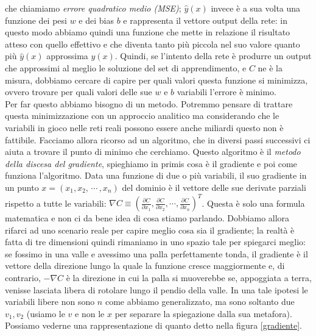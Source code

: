 che chiamiamo \textit{errore quadratico medio (MSE)}; $\hat{y}(x)$ invece è a sua volta una funzione dei pesi $w$ e dei bias $b$ e rappresenta il vettore output della rete: in questo modo abbiamo quindi una funzione che mette in relazione il risultato atteso con quello effettivo e che diventa tanto più piccola nel suo valore quanto più $\hat{y}(x)$ approssima $y(x)$. Quindi, se l'intento della rete è produrre un output che approssimi al meglio le soluzione del set di apprendimento, e $C$ ne è la misura, dobbiamo cercare di capire per quali valori questa funzione si minimizza, ovvero trovare per quali valori delle sue $w$ e $b$ variabili l'errore è minimo. 
\\
Per far questo abbiamo bisogno di un metodo. Potremmo pensare di trattare questa minimizzazione con un approccio analitico ma considerando che le variabili in gioco nelle reti reali possono essere anche miliardi questo non è fattibile. 
Facciamo allora ricorso ad un algoritmo, che in diversi passi successivi ci aiuta a trovare il punto di minimo che cerchiamo. Questo algoritmo è il \textit{metodo della discesa del gradiente}, spieghiamo in primis cosa è il gradiente e poi come funziona l'algoritmo.
Data una funzione di due o più variabili, il suo gradiente in un punto $x=(x_{1}, x_{2},\, \cdots \, , x_{n})$ del dominio è il vettore delle sue derivate parziali rispetto a tutte le variabili: $\nabla C \equiv (\frac{\partial C}{\partial x_{1}}, \frac{\partial C}{\partial x_{2}}, \cdots, \frac{\partial C}{\partial x_{n}})^{T}$. Questa è solo una formula matematica e non ci da bene idea di cosa stiamo parlando. Dobbiamo allora rifarci ad uno scenario reale per capire meglio cosa sia il gradiente; la realtà è fatta di tre dimensioni quindi rimaniamo in uno spazio tale per spiegarci meglio: se fossimo in una valle e avessimo una palla perfettamente tonda, il gradiente è il vettore della direzione lungo la quale la funzione cresce maggiormente e, di contrario, $-\nabla C$ è la direzione in cui la palla si muoverebbe se, appoggiata a terra, venisse lasciata libera di rotolare lungo il pendio della valle. In una tale ipotesi le variabili libere non sono $n$ come abbiamo generalizzato, ma sono soltanto due $v_{1}, v_{2}$ (usiamo le $v$ e non le $x$ per separare la spiegazione dalla sua metafora). Possiamo vederne una rappresentazione di quanto detto nella figura \ref{gradiente}.

